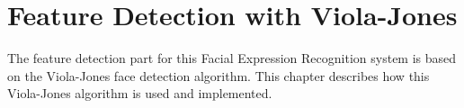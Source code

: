 \chapter{Feature Detection with Viola-Jones}
\label{chap:implementation_violajones}

\noindent The feature detection part for this Facial Expression Recognition system is based on the Viola-Jones face detection algorithm. This chapter describes how this Viola-Jones algorithm is used and implemented.
\newline